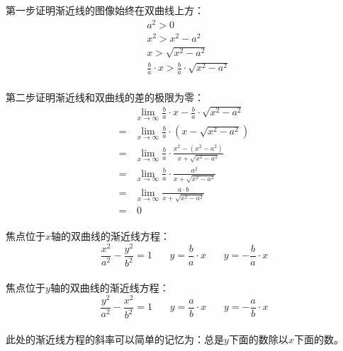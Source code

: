 \documentclass[UTF8]{ctexart}
\begin{document}
    第一步证明渐近线的图像始终在双曲线上方：\vspace{3pt}
    \begin{align}
        &a^2>0\\[5mm]
        &x^2>x^2-a^2\\[5mm]
        &x>\sqrt{x^2-a^2}\\[5mm]
        &\frac{b}{a}\cdot x>\frac{b}{a}\cdot\sqrt{x^2-a^2}
    \end{align}\\
    第二步证明渐近线和双曲线的差的极限为零：\vspace{8pt}
    \begin{align}
        &\lim_{x\rightarrow \infty}\frac{b}{a}\cdot x-\frac{b}{a}\cdot \sqrt{x^2-a^2}\\[4mm]
        =&\lim_{x\rightarrow \infty}\frac{b}{a}\cdot\left(x-\sqrt{x^2-a^2}\right)\\[4mm]
        =&\lim_{x\rightarrow \infty}\frac{b}{a}\cdot\frac{x^2-\left(x^2-a^2\right)}{x+\sqrt{x^2-a^2}}\\[4mm]
        =&\lim_{x\rightarrow \infty}\frac{b}{a}\cdot\frac{a^2}{x+\sqrt{x^2-a^2}}\\[4mm]
        =&\lim_{x\rightarrow \infty}\frac{a\cdot b}{x+\sqrt{x^2-a^2}}\\[4mm]
        =&~0
    \end{align}\\
    焦点位于$x$轴的双曲线的渐近线方程：
    \begin{equation*}
        \frac{x^2}{a^2}-\frac{y^2}{b^2}=1~~~~~~~~y=\frac{b}{a}\cdot x~~~~~~~~y=-\frac{b}{a}\cdot x
    \end{equation*}\\
    焦点位于$y$轴的双曲线的渐近线方程：
    \begin{equation*}
        \frac{y^2}{a^2}-\frac{x^2}{b^2}=1~~~~~~~~y=\frac{a}{b}\cdot x~~~~~~~~y=-\frac{a}{b}\cdot x
    \end{equation*}\\
    此处的渐近线方程的斜率可以简单的记忆为：总是$y$下面的数除以$x$下面的数。

\newpage
\end{document}
